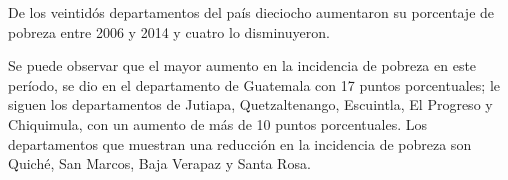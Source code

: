  De los veintidós departamentos del país dieciocho aumentaron su porcentaje de pobreza entre 2006 y 2014 y cuatro lo disminuyeron. 

Se puede observar que el mayor aumento en la incidencia de pobreza  en este período, se dio en el departamento de Guatemala con 17 puntos porcentuales; le siguen los departamentos de Jutiapa, Quetzaltenango, Escuintla, El Progreso y Chiquimula, con un aumento de más de 10 puntos porcentuales. Los departamentos que muestran una reducción en la incidencia de  pobreza son Quiché, San Marcos, Baja Verapaz y Santa Rosa. 